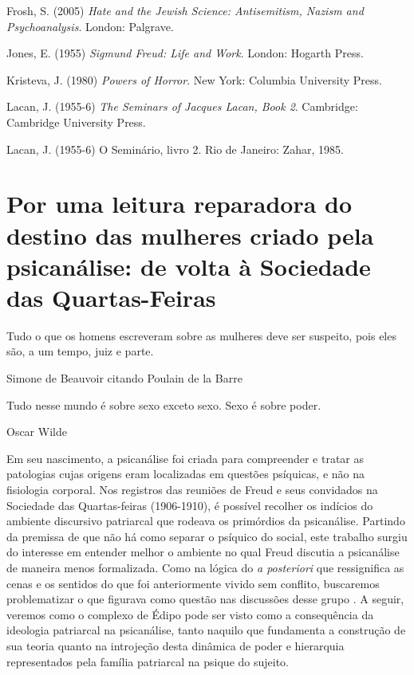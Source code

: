 Frosh, S. (2005) \emph{Hate and the Jewish Science: Antisemitism, Nazism
and Psychoanalysis}. London: Palgrave.

Jones, E. (1955) \emph{Sigmund Freud: Life and Work}. London: Hogarth
Press.

Kristeva, J. (1980) \emph{Powers of Horror}. New York: Columbia
University Press.

Lacan, J. (1955-6) \emph{The Seminars of Jacques Lacan, Book 2}.
Cambridge: Cambridge University Press.

Lacan, J. (1955-6) O Seminário, livro 2. Rio de Janeiro: Zahar, 1985.

\chapter*{Por uma leitura reparadora do destino das mulheres criado
pela psicanálise: de volta à Sociedade das Quartas-Feiras}


\epigraph{Tudo o que os homens escreveram sobre as mulheres deve ser suspeito,
pois eles são, a um tempo, juiz e parte.}{Simone de Beauvoir citando Poulain de la Barre}

\epigraph{Tudo nesse mundo é sobre sexo exceto sexo. Sexo é sobre poder.}{Oscar Wilde}

Em seu nascimento, a psicanálise foi criada para compreender e tratar as
patologias cujas origens eram localizadas em questões psíquicas, e não
na fisiologia corporal. Nos registros das reuniões de Freud e seus
convidados na Sociedade das Quartas-feiras (1906-1910), é possível
recolher os indícios do ambiente discursivo patriarcal que rodeava os
primórdios da psicanálise. Partindo da premissa de que não há como
separar o psíquico do social, este trabalho surgiu do interesse em
entender melhor o ambiente no qual Freud discutia a psicanálise de
maneira menos formalizada. Como na lógica do \emph{a posteriori} que
ressignifica as cenas e os sentidos do que foi anteriormente vivido sem
conflito, buscaremos problematizar o que figurava como questão nas
discussões desse grupo . A seguir, veremos como o complexo de Édipo pode
ser visto como a consequência da ideologia patriarcal na psicanálise,
tanto naquilo que fundamenta a construção de sua teoria quanto na
introjeção desta dinâmica de poder e hierarquia representados pela
família patriarcal na psique do sujeito.

